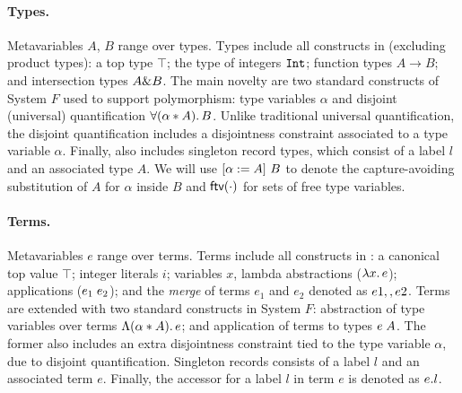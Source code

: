 
\paragraph{Types.} 
Metavariables $A$, $B$ range over types. 
Types include all constructs in \oldname (excluding product types): a top type $\top$; 
the type of integers $\tyint$;
function types $A \to B$; and intersection types $A \inter B$.
The main novelty are two standard constructs of System $F$ used to support
polymorphism: 
type variables $\alpha$ and disjoint (universal) quantification $\fordis \alpha A B$. 
Unlike traditional universal quantification, the disjoint
quantification includes a disjointness constraint associated to a type variable $\alpha$.
Finally, \name also includes singleton record types, which consist of a label $l$ and
an associated type $A$.
We will use $\subst {A} \alpha {B}$
to denote the capture-avoiding substitution of $A$ for $\alpha$ inside $B$ and
$\ftv \cdot$ for sets of free type variables. 

\paragraph{Terms.} 
Metavariables $e$ range over terms.  
Terms include all constructs in \oldname: a canonical top value $\top$; integer literals $i$;
variables $x$, lambda abstractions ($\lamty x A e$); applications 
($\app {e_1} {e_2}$); and the \emph{merge} of terms $e_1$ and $e_2 $ denoted as 
$e1 \mergeop e2$.
Terms are extended with two standard constructs in System $F$:
abstraction of type variables over terms $\blamdis \alpha A e$; and
application of terms to types $\tapp e A$. 
The former also includes an extra disjointness constraint tied to the type 
variable $\alpha$, due to disjoint quantification.
Singleton records consists of a label $l$ and an associated term $e$.
Finally, the accessor for a label $l$ in term $e$ is denoted as $\recordProj e l$.

